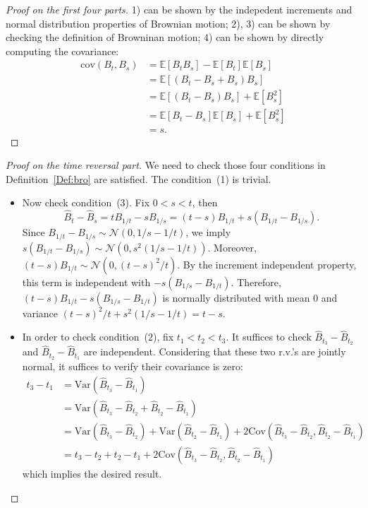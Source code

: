\begin{proof}[Proof on the first four parts]
1) can be shown by the indepedent increments and normal distribution properties of Brownian motion;
2), 3) can be shown by checking the definition of Browninan motion;
4) can be shown by directly computing the covariance:
\begin{align*}
\text{cov}(B_t,B_s)&=\mathbb{E}[B_tB_s] - \mathbb{E}[B_t]\mathbb{E}[B_s]\\
&=\mathbb{E}[(B_t - B_s+B_s)B_s] \\&=\mathbb{E}[(B_t - B_s)B_s] + \mathbb{E}[B_s^2]\\
&=\mathbb{E}[B_t - B_s] \mathbb{E}[B_s]+\mathbb{E}[B_s^2]\\
&=s.
\end{align*}
\end{proof}
\begin{proof}[Proof on the time reversal part]
We need to check those four conditions in Definition~\ref{Def:bro} are satisfied.
The condition~(1) is trivial.
\begin{itemize}
\item
Now check condition~(3).
Fix $0<s<t$, then \[\hat{B}_t -\hat{B}_s = tB_{1/t} - sB_{1/s}=(t-s)B_{1/t}+s(B_{1/t}-B_{1/s}).\]
Since $B_{1/t}-B_{1/s}\sim\mathcal{N}(0, 1/s-1/t)$, we imply $s(B_{1/t}-B_{1/s})\sim\mathcal{N}(0, s^2(1/s-1/t))$.
Moreover, $(t-s)B_{1/t}\sim\mathcal{N}(0,(t-s)^2/t)$. By the increment independent property, 
this term is independent with $-s(B_{1/s}-B_{1/t})$.
Therefore, $(t-s)B_{1/t}-s(B_{1/s}-B_{1/t})$ is normally distributed with mean $0$ and variance 
$(t-s)^2/t+s^2(1/s-1/t)=t-s$.
\item
In order to check condition~(2), fix $t_1<t_2<t_3$. It suffices to check 
$\hat{B}_{t_3} -\hat{B}_{t_2}$ and $\hat{B}_{t_2} -\hat{B}_{t_1}$ are independent.
Considering that these two r.v.'s are jointly normal, it suffices to verify their covariance is zero:
\begin{align*}
t_3-t_1&=\text{Var}(\hat{B}_{t_3} -\hat{B}_{t_1})\\
&=\text{Var}(\hat{B}_{t_3} -\hat{B}_{t_2}+\hat{B}_{t_2} -\hat{B}_{t_1})\\
&=\text{Var}(\hat{B}_{t_3} -\hat{B}_{t_2})+\text{Var}(\hat{B}_{t_2} -\hat{B}_{t_1})
+2\text{Cov}(\hat{B}_{t_3} -\hat{B}_{t_2},\hat{B}_{t_2} -\hat{B}_{t_1})\\
&=t_3-t_2+t_2-t_1+2\text{Cov}(\hat{B}_{t_3} -\hat{B}_{t_2},\hat{B}_{t_2} -\hat{B}_{t_1})
\end{align*}
which implies the desired result.


\end{itemize}
\end{proof}
